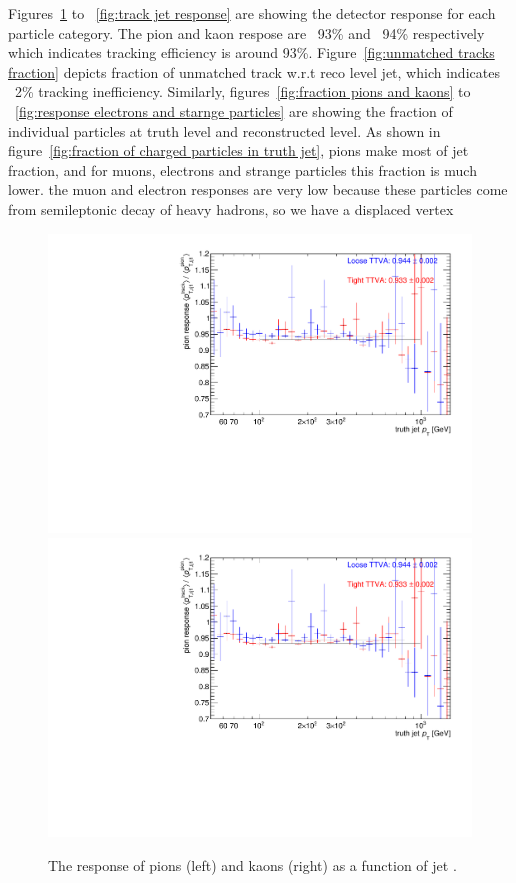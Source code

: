 Figures~\ref{fig:response pion and kaon} to ~\ref{fig:track jet response} are showing the detector response for each particle category. The pion and kaon respose are ~93\% and ~94\% respectively which indicates tracking efficiency is around 93\%. Figure~\ref{fig:unmatched tracks fraction} depicts fraction of unmatched track w.r.t reco level jet, which indicates ~2\% tracking inefficiency. Similarly, figures~\ref{fig:fraction pions and kaons} to ~\ref{fig:response electrons and starnge particles} are showing the fraction of individual particles at truth level and reconstructed level. As shown in figure~\ref{fig:fraction of charged particles in truth jet}, pions make most of jet fraction, and for muons, electrons and strange particles this fraction is much lower. the muon and electron responses are very low because these particles come from semileptonic decay of heavy hadrons, so we have a displaced vertex

\begin{figure}
\centering
\includegraphics[scale=0.3, page=1]{figures/jet_comp_study_powheg_Tight_MultiplicityFraction_withLooseandTight.pdf}
\includegraphics[scale=0.3, page=2]{figures/jet_comp_study_powheg_Tight_MultiplicityFraction_withLooseandTight.pdf}
\caption {The response of pions (left) and  kaons (right) as a function of jet \pT.}
\label{fig:response pion and kaon}
\end{figure}

